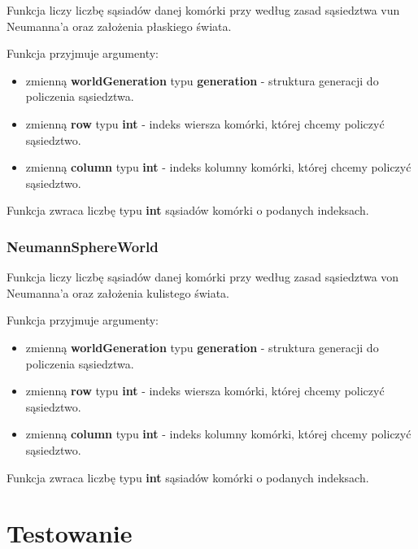 \documentclass[a4paper]{article}
\begin{document}
\quad Funkcja liczy liczb\k{e} s\k{a}siad\'ow danej kom\'orki przy wed\l{}ug zasad s\k{a}siedztwa vun Neumanna'a oraz za\l{}o\.zenia p\l{}askiego \'swiata.

Funkcja przyjmuje argumenty:

\begin{itemize}
        \item zmienn\k{a} \textbf{worldGeneration} typu \textbf{generation} - struktura generacji do policzenia s\k{a}siedztwa.
        \item zmienn\k{a} \textbf{row} typu \textbf{int} - indeks wiersza kom\'orki, kt\'orej chcemy policzy\'c s\k{a}siedztwo.
        \item zmienn\k{a} \textbf{column} typu \textbf{int} - indeks kolumny kom\'orki, kt\'orej chcemy policzy\'c s\k{a}siedztwo.
\end{itemize}

\quad Funkcja zwraca liczb\k{e} typu \textbf{int} s\k{a}siad\'ow kom\'orki o podanych indeksach.


\subsubsection{NeumannSphereWorld}

\quad Funkcja liczy liczb\k{e} s\k{a}siad\'ow danej kom\'orki przy wed\l{}ug zasad s\k{a}siedztwa von Neumanna'a oraz za\l{}o\.zenia kulistego \'swiata.

Funkcja przyjmuje argumenty:

\begin{itemize}
        \item zmienn\k{a} \textbf{worldGeneration} typu \textbf{generation} - struktura generacji do policzenia s\k{a}siedztwa.
        \item zmienn\k{a} \textbf{row} typu \textbf{int} - indeks wiersza kom\'orki, kt\'orej chcemy policzy\'c s\k{a}siedztwo.
        \item zmienn\k{a} \textbf{column} typu \textbf{int} - indeks kolumny kom\'orki, kt\'orej chcemy policzy\'c s\k{a}siedztwo.
\end{itemize}

\quad Funkcja zwraca liczb\k{e} typu \textbf{int} s\k{a}siad\'ow kom\'orki o podanych indeksach.



\section{Testowanie}
\end{document}
